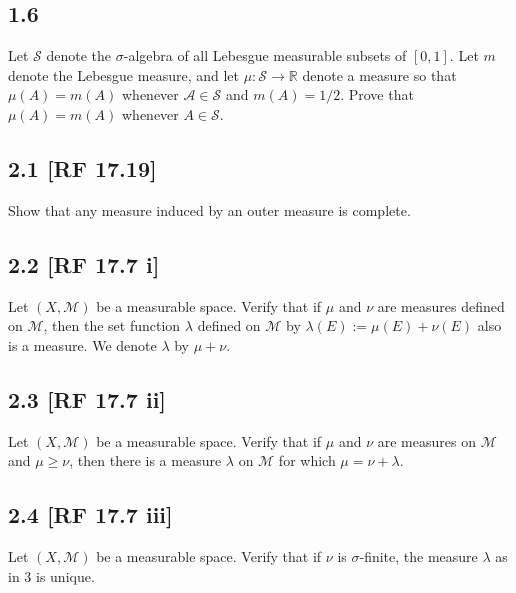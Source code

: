 \documentclass[12pt]{article}
\begin{document}
\subsection*{1.6}
\begin{tcolorbox}
Let $\mathcal{S}$ denote the $\sigma$-algebra of all Lebesgue measurable subsets of $[0,1]$. Let $m$ denote the Lebesgue measure, and let $\mu :
\mathcal{S} \rightarrow \mathbb{R}$ denote a measure so that $\mu(A) = m(A)$ whenever $\mathcal{A} \in \mathcal{S}$ and $m(A) = 1/2$. Prove that
$\mu(A) = m(A)$ whenever $A \in \mathcal{S}$.
\end{tcolorbox}


\subsection*{2.1 [RF 17.19]}
\begin{tcolorbox}
Show that any measure induced by an outer measure is complete.
\end{tcolorbox}


\subsection*{2.2 [RF 17.7 i]}
\begin{tcolorbox}
Let $(X,\mathcal{M})$ be a measurable space. Verify that if $\mu$ and $\nu$ are measures defined on $\mathcal{M}$, then the set function $\lambda$ defined on
$\mathcal{M}$ by $\lambda(E) := \mu(E) + \nu(E)$ also is a measure. We denote $\lambda$ by $\mu + \nu$.
\end{tcolorbox}

\subsection*{2.3 [RF 17.7 ii]}
\begin{tcolorbox}
Let $(X,\mathcal{M})$ be a measurable space. Verify that if $\mu$ and $\nu$ are measures on $\mathcal{M}$ and $\mu \geq \nu$, then there is a measure
$\lambda$ on $\mathcal{M}$ for which $\mu = \nu + \lambda$.
\end{tcolorbox}


\subsection*{2.4 [RF 17.7 iii]}
\begin{tcolorbox}
Let $(X,\mathcal{M})$ be a measurable space. Verify that if $\nu$ is $\sigma$-finite, the measure $\lambda$ as in 3 is unique.
\end{tcolorbox}
\end{document}
